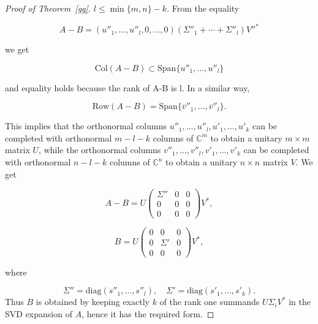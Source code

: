 \documentclass[10pt,a4paper]{amsart}
\begin{document}
\begin{proof}[Proof of Theorem~\ref{gg}]
$
l \leq \min\{m, n\} - k.
$
From the equality 

\[
A - B = (u''_1, \dots, u''_l, 0, \dots, 0)(\Sigma''_1 + \cdots + \Sigma''_l)V''^*
\]

we get 

\[
\text{Col}(A - B) \subset \text{Span}\{u''_1, \dots, u''_l\}
\]

and equality holds because the rank of A-B is l. In a similar way, 

\[
\text{Row}(A - B) = \text{Span}\{\overline{v}''_1, \dots, \overline{v}''_l\}.
\]

This implies that the orthonormal columns \( u''_1, \dots, u''_l, u'_1, \dots, u'_k \) can be completed with orthonormal \( m - l - k \) columns of \( \mathbb{C}^m \) to obtain a unitary \( m \times m \) matrix \( U \), while the orthonormal columns \( v''_1, \dots, v''_l, v'_1, \dots, v'_k \) can be completed with orthonormal \( n - l - k \) columns of \( \mathbb{C}^n \) to obtain a unitary \( n \times n \) matrix \( V \). We get 

\[
A - B = U
\begin{pmatrix}
\Sigma'' & 0 & 0 \\
0 & 0 & 0 \\
0 & 0 & 0
\end{pmatrix}
V^*,
\]

\[
B = U
\begin{pmatrix}
0 & 0 & 0 \\
0 & \Sigma' & 0 \\
0 & 0 & 0
\end{pmatrix}
V^*,
\]

where 

\[
\Sigma'' = \mathrm{diag}(s''_1, \dots, s''_l), \quad \Sigma' = \mathrm{diag}(s'_1, \dots, s'_k).
\]
 Thus $B$ is obtained by keeping exactly $k$ of the rank one summands $U\Sigma_iV^*$ in the SVD expansion of $A$, hence it has the required form.



\end{proof}
\end{document}
